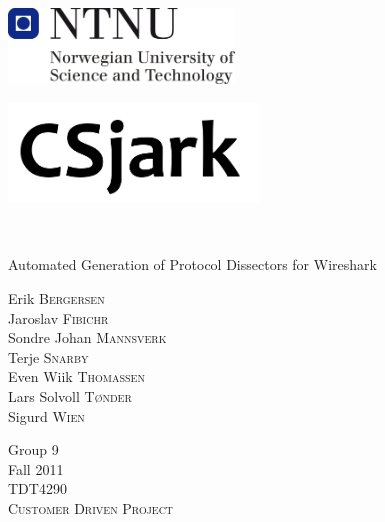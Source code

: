 
\begin{titlepage}
\begin{center}

\includegraphics[width=0.45\textwidth]{./img/NTNU-logo.png}\\[6cm]    


\begin{flushleft}
\includegraphics[width=0.5\textwidth]{./img/CSjark.png}
\end{flushleft}

\HRule \\[0.2cm]

\begin{flushright}
{ \Large Automated Generation of Protocol Dissectors for Wireshark}\\
\end{flushright}



\vfill

\begin{minipage}{0.45\linewidth}
\begin{flushleft} 
Erik \textsc{Bergersen}\\
Jaroslav \textsc{Fibichr}\\
Sondre Johan \textsc{Mannsverk}\\
Terje \textsc{Snarby}\\
Even Wiik \textsc{Thomassen}\\
Lars Solvoll \textsc{T\o nder}\\
Sigurd \textsc{Wien}
\end{flushleft}
\end{minipage}
\begin{minipage}{0.45\linewidth}
\begin{flushright} 
Group 9\\
Fall 2011\\[1.5cm]
\textsc{TDT4290}\\
\textsc{Customer Driven Project}\\
\end{flushright}
\end{minipage}




\end{center}
\end{titlepage}